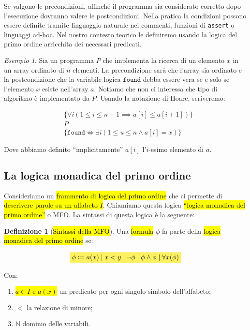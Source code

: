 \documentclass[a4paper,11pt,twoside]{article}
\theoremstyle{plain}
\theoremstyle{definition}
\newtheorem{defn}{Definizione}[section]
\theoremstyle{remark}
\newtheorem{esempio}{Esempio}[section]
\newcommand{\mhl}[1]{\colorbox{hlcolor}{$\displaystyle #1$}}
\begin{document}
Se valgono le precondizioni, affinché il programma sia considerato corretto
dopo l'esecuzione dovranno valere le postcondizioni. Nella pratica la condizioni
possono essere definite tramite linguaggio naturale nei commenti, funzioni di
\texttt{assert} o linguaggi ad-hoc. Nel nostro contesto teorico le definiremo
usando la logica del primo ordine arricchita dei necessari predicati.

\begin{esempio}
  Sia un programma $P$ che implementa la ricerca di un
  elemento $x$ in un array ordinato di $n$ elementi. La precondizione sarà che
  l'array sia ordinato e la postcondizione che la variabile logica
  $\mathtt{found}$ debba essere vera se e solo se l'elemento $x$ esiste
  nell'array $a$. Notiamo che non ci interessa che tipo di algoritmo è
  implementato da $P$. Usando la notazione di Hoare, scriveremo:

  \[
    \begin{aligned}
      & \{ \forall i (1 \leq i \leq n-1 \implies a[i] \leq a[i+1] ) \} \\
      & P \\
      & \{ \mathtt{found} \iff \exists i (1 \leq u \leq n \land a[i] = x ) \}
    \end{aligned}
  \]

  Dove abbiamo definito ``implicitamente'' $a[i]$ l'$i$-esimo elemento di $a$.
\end{esempio}

\subsection{La logica monadica del primo ordine}\label{sec:mfo}

Consideriamo un \hl{frammento di logica del primo ordine} che ci permette di
\hl{descrivere parole su un alfabeto $I$}. Chiamiamo questa logica \hl{``logica
monadica del primo ordine''} o MFO\@. La sintassi di questa logica è la
seguente:

\begin{defn}[\hl{Sintassi della MFO}]\label{def:mfo-sintassi}
  Una \hl{formula} $\phi$ fa parte della \hl{logica monadica del primo ordine}
  se:

  \begin{equation}
    \mhl{
    \phi\coloneqq a(x) \mid x < y \mid\neg\phi\mid\phi\land\phi\mid\forall x(\phi)
    }
  \end{equation}

  Con:
  \begin{enumerate}
    \item \hl{$a \in I$ e $a(x)$} un predicato per ogni singolo simbolo
      dell'alfabeto;
    \item $<$ la relazione di minore;
    \item $\mathbb{N}$ dominio delle variabili.
  \end{enumerate}
\end{defn}
\end{document}
